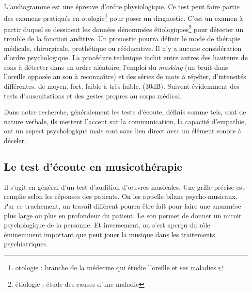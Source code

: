   L'audiogramme est une épreuve d'ordre physiologique. Ce test peut faire partie des examens  pratiqués en otologie\footnote{otologie : branche de la médecine
  	qui étudie l'oreille et ses maladies.} pour poser un diagnostic. 
   C'est un examen à partir duquel se
  dessinent les données dénommées étiologiques\footnote{étiologie : étude des causes
  	d'une maladie} pour détecter un trouble de la fonction auditive. Un pronostic pourra définir le mode de thérapie
médicale, chirurgicale, prothétique ou rééducative.
Il n'y a aucune considération d'ordre psychologique. La procédure technique inclut entre autres des hauteurs de sons à détecter dans un ordre aléatoire, l'emploi du \emph{masking} (un bruit dans l'oreille opposée
au son à reconnaître) et des séries de
mots
à répéter, d'intensités différentes, de moyen,
fort, faible à très faible. (30dB). Suivent évidemment des tests d'auscultations et des gestes propres au corps médical. 

Dans notre recherche, généralement les tests d'écoute, définis comme tels, sont de nature verbale, ils mettent l'accent sur la communication, la capacité d'empathie, ont un aspect psychologique mais sont sans lien direct avec un élément sonore à déceler. 

\subsection{Le test d'écoute en musicothérapie} 

 Il s'agit en général d'un test d'audition d'\oe uvres musicales. Une grille précise est remplie selon les réponses des patients. On les appelle bilans psycho-musicaux. Par ce truchement, un travail différent pourra être fait pour faire une anamnèse plus large ou plus en profondeur du patient. Le son permet de donner un miroir psychologique de la personne. Et inversement, on s'est aperçu du rôle éminemment important que peut jouer la musique dans les traitements psychiatriques. 
 
